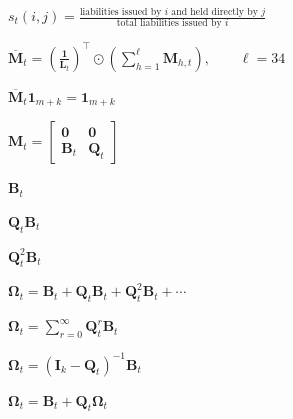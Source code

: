 \documentclass[12pt]{article}
\newenvironment{slidemath}
  {\begin{preview}\color{mssnavy}\(\displaystyle}
  {\)\end{preview}}
\begin{document}
\begin{slidemath}
s_t(i,j)=
\frac{\text{liabilities issued by }i\text{ and held directly by }j}
     {\text{total liabilities issued by }i}
\end{slidemath}

\begin{slidemath}
\overline{\mathbf M}_t
=
\left(\frac{\mathbf 1}{\mathbf L_t}\right)^{\!\top}
\odot
\left(\sum_{h=1}^{\ell}\mathbf M_{h,t}\right),
\qquad \ell=34
\end{slidemath}

\begin{slidemath}
\overline{\mathbf M}_t\mathbf 1_{m+k}=\mathbf 1_{m+k}
\end{slidemath}

\begin{slidemath}
\mathbf M_t=
\begin{bmatrix}
\mathbf 0 & \mathbf 0\\
\mathbf B_t & \mathbf Q_t
\end{bmatrix}
\end{slidemath}

\begin{slidemath}
\mathbf B_t
\end{slidemath}

\begin{slidemath}
\mathbf Q_t\mathbf B_t
\end{slidemath}

\begin{slidemath}
\mathbf Q_t^2\mathbf B_t
\end{slidemath}

\begin{slidemath}
\boldsymbol\Omega_t
=\mathbf B_t+\mathbf Q_t\mathbf B_t+\mathbf Q_t^2\mathbf B_t+\cdots
\end{slidemath}

\begin{slidemath}
\boldsymbol\Omega_t
=\sum_{r=0}^{\infty}\mathbf Q_t^r\mathbf B_t
\end{slidemath}

\begin{slidemath}
\boldsymbol\Omega_t
=(\mathbf I_k-\mathbf Q_t)^{-1}\mathbf B_t
\end{slidemath}

\begin{slidemath}
\boldsymbol\Omega_t
=\mathbf B_t+\mathbf Q_t\boldsymbol\Omega_t
\end{slidemath}
\end{document}
